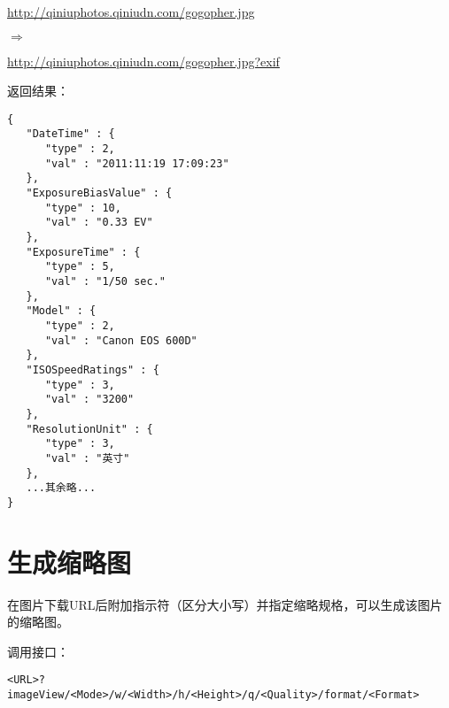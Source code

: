 \documentclass[11pt, oneside]{book}
\newcommand{\qpar}[1]{
\vspace{0.25em}
\noindent
#1\par
\vspace{0.25em}
}
\newcommand{\qurl}[1]{\url{#1}}
\newcommand{\qqbox}[1]{\hspace{0.2em}\fbox{#1}\hspace{0.2em}}
\begin{document}
\begin{CJK*}{UTF8}{song}
\begin{sample}
    \qpar{\qurl{http://qiniuphotos.qiniudn.com/gogopher.jpg}}
    \qpar{$\Rightarrow$}
    \qpar{\qurl{http://qiniuphotos.qiniudn.com/gogopher.jpg?exif}}

    \qpar{返回结果：}
\begin{verbatim}
{
   "DateTime" : {
      "type" : 2,
      "val" : "2011:11:19 17:09:23"
   },
   "ExposureBiasValue" : {
      "type" : 10,
      "val" : "0.33 EV"
   },
   "ExposureTime" : {
      "type" : 5,
      "val" : "1/50 sec."
   },
   "Model" : {
      "type" : 2,
      "val" : "Canon EOS 600D"
   },
   "ISOSpeedRatings" : {
      "type" : 3,
      "val" : "3200"
   },
   "ResolutionUnit" : {
      "type" : 3,
      "val" : "英寸"
   },
   ...其余略...
}
\end{verbatim}
  \label{exif}
\end{sample}

\clearpage

\section{生成缩略图}

\qpar{在图片下载URL后附加\qqbox{imageView}指示符（区分大小写）并指定缩略规格，可以生成该图片的缩略图。}
\qpar{调用接口：}
\begin{lstlisting}[basicstyle=\ttfamily\footnotesize]
<URL>?imageView/<Mode>/w/<Width>/h/<Height>/q/<Quality>/format/<Format>
\end{lstlisting}



\end{CJK*}
\end{document}
